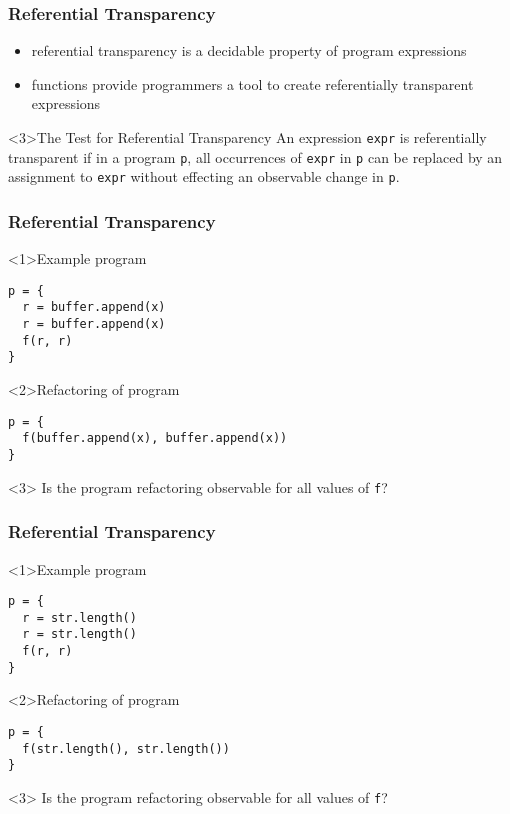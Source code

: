 \begin{frame}
\frametitle{Referential Transparency}
\begin{itemize}
  \item<1-> referential transparency is a decidable property of program expressions
  \item<2-> functions provide programmers a tool to create referentially transparent expressions
\end{itemize}
\begin{block}<3>{The Test for Referential Transparency}
An expression \lstinline$expr$ is referentially transparent if in a program \lstinline$p$, all occurrences of \lstinline$expr$ in \lstinline$p$ can be replaced by an assignment to \lstinline$expr$ without effecting an observable change in \lstinline$p$.
\end{block}
\end{frame}

\begin{frame}[fragile]
\frametitle{Referential Transparency}
\begin{block}<1>{Example program}
\begin{lstlisting}
p = {
  r = buffer.append(x)
  r = buffer.append(x)
  f(r, r)
}
\end{lstlisting}
\end{block}
\begin{block}<2>{Refactoring of program}
\begin{lstlisting}
p = {
  f(buffer.append(x), buffer.append(x))
}
\end{lstlisting}
\end{block}
\begin{block}<3>{}
Is the program refactoring observable for all values of \lstinline$f$?
\end{block}
\end{frame}

\begin{frame}[fragile]
\frametitle{Referential Transparency}
\begin{block}<1>{Example program}
\begin{lstlisting}
p = {
  r = str.length()
  r = str.length()
  f(r, r)
}
\end{lstlisting}
\end{block}
\begin{block}<2>{Refactoring of program}
\begin{lstlisting}
p = {
  f(str.length(), str.length())
}
\end{lstlisting}
\end{block}
\begin{block}<3>{}
Is the program refactoring observable for all values of \lstinline$f$?
\end{block}
\end{frame}

